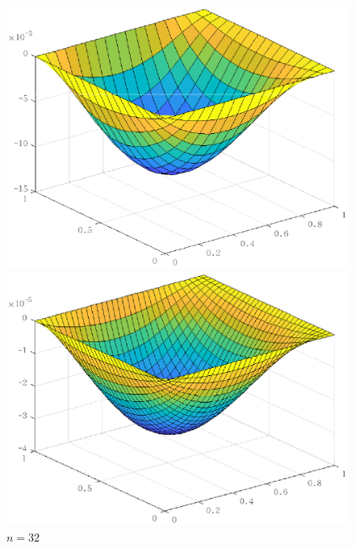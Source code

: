 \documentclass[lang=cn,11pt,a4paper]{elegantpaper}
\begin{document}
\begin{figure}[htbp]
  \centering
  \begin{minipage}[t]{0.24\linewidth}
      \centering
      \includegraphics[width=0.95\linewidth]{figure/error_problem1_D_r_n=16.eps}
      \caption*{$n=16$}
  \end{minipage}
  \begin{minipage}[t]{0.24\linewidth}
    \centering
    \includegraphics[width=0.95\linewidth]{figure/error_problem1_D_r_n=32.eps}
    \caption*{$n=32$}
  \end{minipage}
  \begin{minipage}[t]{0.24\linewidth}
    \centering

\end{minipage}
\end{figure}
\end{document}
